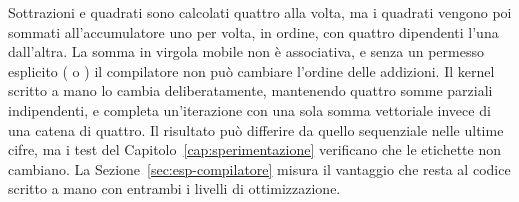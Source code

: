 Sottrazioni e quadrati sono calcolati quattro alla volta, ma i quadrati vengono poi sommati all'accumulatore uno per volta, in ordine, con quattro  dipendenti l'una dall'altra. La somma in virgola mobile non è associativa, e senza un permesso esplicito ( o ) il compilatore non può cambiare l'ordine delle addizioni. Il kernel scritto a mano lo cambia deliberatamente, mantenendo quattro somme parziali indipendenti, e completa un'iterazione con una sola somma vettoriale invece di una catena di quattro. Il risultato può differire da quello sequenziale nelle ultime cifre, ma i test del Capitolo~\ref{cap:sperimentazione} verificano che le etichette non cambiano. La Sezione~\ref{sec:esp-compilatore} misura il vantaggio che resta al codice scritto a mano con entrambi i livelli di ottimizzazione.

